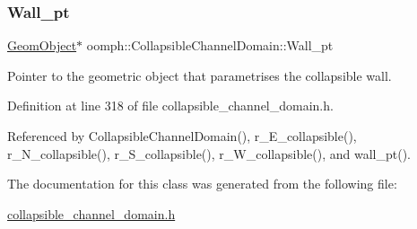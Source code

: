 \mbox{\label{classoomph_1_1CollapsibleChannelDomain_a6f1ef65c47937800e35477863b1439ab}} 
\subsubsection{\texorpdfstring{Wall\+\_\+pt}{Wall\_pt}}
{\footnotesize\ttfamily \hyperlink{classoomph_1_1GeomObject}{Geom\+Object}$\ast$ oomph\+::\+Collapsible\+Channel\+Domain\+::\+Wall\+\_\+pt\hspace{0.3cm}{\ttfamily [private]}}



Pointer to the geometric object that parametrises the collapsible wall. 



Definition at line 318 of file collapsible\+\_\+channel\+\_\+domain.\+h.



Referenced by Collapsible\+Channel\+Domain(), r\+\_\+\+E\+\_\+collapsible(), r\+\_\+\+N\+\_\+collapsible(), r\+\_\+\+S\+\_\+collapsible(), r\+\_\+\+W\+\_\+collapsible(), and wall\+\_\+pt().



The documentation for this class was generated from the following file\+:\begin{DoxyCompactItemize}
\item 
\hyperlink{collapsible__channel__domain_8h}{collapsible\+\_\+channel\+\_\+domain.\+h}\end{DoxyCompactItemize}
